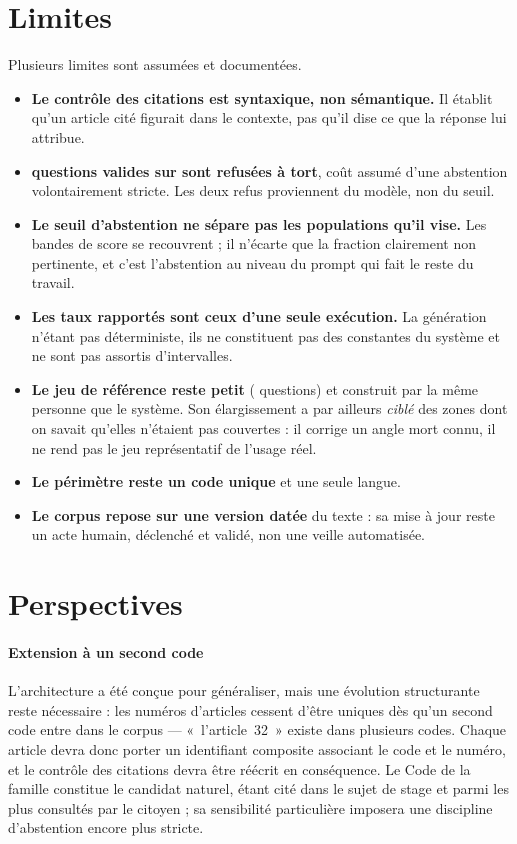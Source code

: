 \section*{Limites}

Plusieurs limites sont assumées et documentées.

\begin{itemize}
  \item \textbf{Le contrôle des citations est syntaxique, non sémantique.} Il établit qu'un article
        cité figurait dans le contexte, pas qu'il dise ce que la réponse lui attribue.
  \item \textbf{\NbRefusTort{} questions valides sur \NbInScope{} sont refusées à tort}, coût
        assumé d'une abstention volontairement stricte. Les deux refus proviennent du modèle, non
        du seuil.
  \item \textbf{Le seuil d'abstention ne sépare pas les populations qu'il vise.} Les bandes de
        score se recouvrent ; il n'écarte que la fraction clairement non pertinente, et c'est
        l'abstention au niveau du prompt qui fait le reste du travail.
  \item \textbf{Les taux rapportés sont ceux d'une seule exécution.} La génération n'étant pas
        déterministe, ils ne constituent pas des constantes du système et ne sont pas assortis
        d'intervalles.
  \item \textbf{Le jeu de référence reste petit} (\NbQuestions{} questions) et construit par la
        même personne que le système. Son élargissement a par ailleurs \emph{ciblé} des zones dont
        on savait qu'elles n'étaient pas couvertes : il corrige un angle mort connu, il ne rend pas
        le jeu représentatif de l'usage réel.
  \item \textbf{Le périmètre reste un code unique} et une seule langue.
  \item \textbf{Le corpus repose sur une version datée} du texte : sa mise à jour reste un acte
        humain, déclenché et validé, non une veille automatisée.
\end{itemize}

\section*{Perspectives}

\paragraph{Extension à un second code}
L'architecture a été conçue pour généraliser, mais une évolution structurante reste nécessaire :
les numéros d'articles cessent d'être uniques dès qu'un second code entre dans le corpus ---
«~l'article~32~» existe dans plusieurs codes. Chaque article devra donc porter un identifiant
composite associant le code et le numéro, et le contrôle des citations devra être réécrit en
conséquence. Le Code de la famille constitue le candidat naturel, étant cité dans le sujet de
stage et parmi les plus consultés par le citoyen ; sa sensibilité particulière imposera une
discipline d'abstention encore plus stricte.

